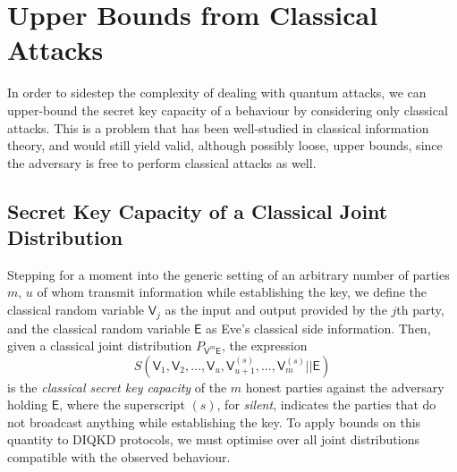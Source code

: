 \documentclass[10pt, a4paper]{article}
\numberwithin{equation}{section} %
\theoremstyle{definition}
\theoremstyle{plain}
\newcommand{\?}{\mathrel{?}} %
\newcommand{\cvec}[1]{\boldsymbol{\mathbf{#1}}}    %
\newcommand{\crv}[1]{\mathsf{#1}}
\begin{document}
                        \section{Upper Bounds from Classical Attacks}\label{sec:ubound}

                        In order to sidestep the complexity of dealing with quantum attacks, we can upper-bound the secret key capacity of a behaviour by considering only classical attacks. This is a problem that has been well-studied in classical information theory, and would still yield valid, although possibly loose, upper bounds, since the adversary is free to perform classical attacks as well.

                        \subsection{Secret Key Capacity of a Classical Joint Distribution}

                        Stepping for a moment into the generic setting of an arbitrary number of parties \(m\), \(u\) of whom transmit information while establishing the key, we define the classical random variable \(\crv{V}_j\) as the input and output provided by the \(j\)th party, and the classical random variable \(\crv{E}\) as Eve's classical side information. Then, given a classical joint distribution \(P_{\cvec{\crv{V}}^m\crv{E}}\), the expression
                        \begin{equation}
                          S(\crv{V}_1, \crv{V}_2, \ldots, \crv{V}_{u}, \crv{V}_{u+1}^{(s)}, \ldots, \crv{V}_{m}^{(s)} || \crv{E})
                        \end{equation}
                        is the \emph{classical secret key capacity} of the \(m\) honest parties against the adversary holding \(\crv{E}\), where the superscript \((s)\), for \emph{silent}, indicates the parties that do not broadcast anything while establishing the key. To apply bounds on this quantity to DIQKD protocols, we must optimise over all joint distributions compatible with the observed behaviour.


                        \newcommand{\splitkey}[3][\crv{J}]{I_{#1}\left(#2||#3\right)}
\end{document}
